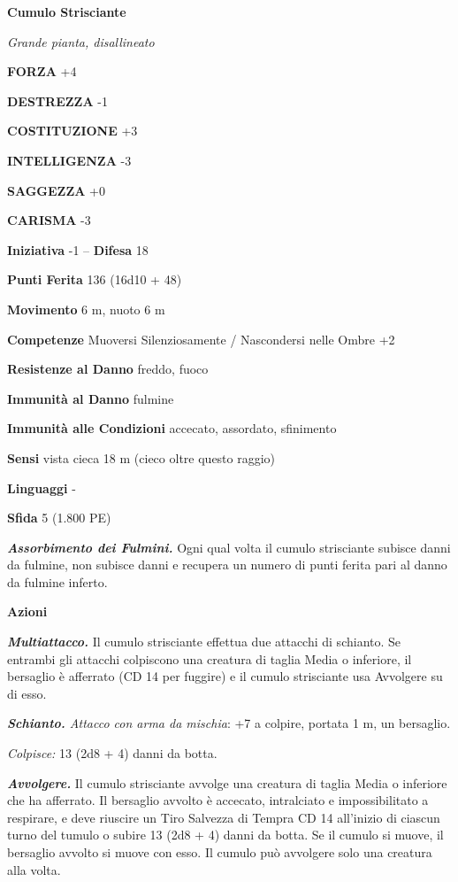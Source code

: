 \begin{multicols}{2}
\medskip{}\textbf{Cumulo Strisciante}

\emph{Grande pianta, disallineato}

\textbf{FORZA} +4

\textbf{DESTREZZA} -1

\textbf{COSTITUZIONE} +3

\textbf{INTELLIGENZA} -3

\textbf{SAGGEZZA} +0

\textbf{CARISMA} -3

\textbf{Iniziativa} -1 -- \textbf{Difesa} 18

\textbf{Punti Ferita} 136 (16d10 + 48)

\textbf{Movimento} 6 m, nuoto 6 m

\textbf{Competenze} Muoversi Silenziosamente / Nascondersi nelle Ombre +2

\textbf{Resistenze al Danno} freddo, fuoco

\textbf{Immunità al Danno} fulmine

\textbf{Immunità alle Condizioni} accecato, assordato, sfinimento

\textbf{Sensi} vista cieca 18 m (cieco oltre questo raggio)

\textbf{Linguaggi} -

\textbf{Sfida} 5 (1.800 PE)

\emph{\textbf{Assorbimento dei Fulmini.}} Ogni qual volta il cumulo strisciante subisce danni da fulmine, non subisce danni e recupera un numero di punti ferita pari al danno da fulmine inferto.

\textbf{Azioni}

\emph{\textbf{Multiattacco.}} Il cumulo strisciante effettua due attacchi di schianto. Se entrambi gli attacchi colpiscono una creatura di taglia Media o inferiore, il bersaglio è afferrato (CD 14 per fuggire) e il cumulo strisciante usa Avvolgere su di esso.

\emph{\textbf{Schianto.} Attacco con arma da mischia}: +7 a colpire, portata 1 m, un bersaglio.

\emph{Colpisce:} 13 (2d8 + 4) danni da botta.

\emph{\textbf{Avvolgere.}} Il cumulo strisciante avvolge una creatura di taglia Media o inferiore che ha afferrato. Il bersaglio avvolto è accecato, intralciato e impossibilitato a respirare, e deve riuscire un Tiro Salvezza di Tempra CD 14 all'inizio di ciascun turno del tumulo o subire 13 (2d8 + 4) danni da botta. Se il cumulo si muove, il bersaglio avvolto si muove con esso. Il cumulo può avvolgere solo una creatura alla volta.


\end{multicols}

